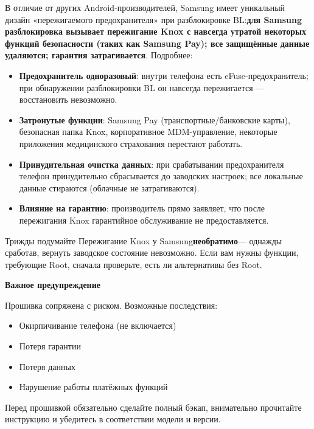 
В отличие от других Android-производителей, Samsung имеет уникальный дизайн «пережигаемого предохранителя» при разблокировке BL:\textbf{для Samsung разблокировка вызывает пережигание Knox с навсегда утратой некоторых функций безопасности (таких как Samsung Pay); все защищённые данные удаляются; гарантия затрагивается}. Подробнее:

\begin{itemize}
  \item \textbf{Предохранитель одноразовый}: внутри телефона есть eFuse-предохранитель; при обнаружении разблокировки BL он навсегда пережигается — восстановить невозможно.
  \item \textbf{Затронутые функции}: Samsung Pay (транспортные/банковские карты), безопасная папка Knox, корпоративное MDM-управление, некоторые приложения медицинского страхования перестают работать.
  \item \textbf{Принудительная очистка данных}: при срабатывании предохранителя телефон принудительно сбрасывается до заводских настроек; все локальные данные стираются (облачные не затрагиваются).
  \item \textbf{Влияние на гарантию}: производитель прямо заявляет, что после пережигания Knox гарантийное обслуживание не предоставляется.
\end{itemize}

\begin{tcbwarn}{Трижды подумайте}
Пережигание Knox у Samsung\textbf{необратимо}— однажды сработав, вернуть заводское состояние невозможно. Если вам нужны функции, требующие Root, сначала проверьте, есть ли альтернативы без Root.

\end{tcbwarn}

\textbf{Важное предупреждение}\par

Прошивка сопряжена с риском. Возможные последствия:

\begin{itemize}
  \item Окирпичивание телефона (не включается)
  \item Потеря гарантии
  \item Потеря данных
  \item Нарушение работы платёжных функций
\end{itemize}

Перед прошивкой обязательно сделайте полный бэкап, внимательно прочитайте инструкцию и убедитесь в соответствии модели и версии.

